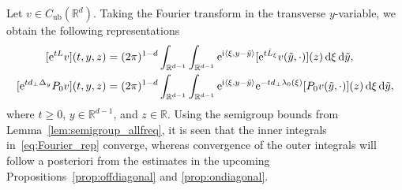 \documentclass[12pt,oneside,a4paper,reqno]{amsart}
\numberwithin{equation}{section}
\theoremstyle{definition}
\theoremstyle{remark}
\newcommand{\bbR}{{\mathbb R}}
\newcommand{\rd}{{\,\rm{d}}}
\newcommand{\Cub}{{C_{\mathrm{ub}}}}
\newcommand{\re}{{\rm e}}
\newcommand{\ri}{{\rm i}}
\begin{document}
Let $v \in \Cub(\bbR^{d})$. Taking the Fourier transform in the transverse $y$-variable, we obtain the following representations
\begin{align} \label{eq:Fourier_rep}
\begin{split}
    [\re^{tL}v](t,y,z) &= (2\pi)^{1-d}\int_{\bbR^{d-1}} \int_{\bbR^{d-1}} \re^{\ri \langle \xi, y - \tilde{y}\rangle} [\re^{t\hat{L}_{\xi}}v(\tilde{y},\cdot)](z) \rd \xi \rd \tilde{y}, \\
    [\re^{t d_{\bot}\Delta_y}P_0 v](t,y,z) &= (2\pi)^{1-d}\int_{\bbR^{d-1}} \int_{\bbR^{d-1}} \re^{\ri \langle \xi, y - \tilde{y}\rangle} \re^{-td_{\bot}\lambda_0(\xi)}[P_0 v(\tilde{y},\cdot)](z) \rd \xi \rd \tilde{y},
\end{split}
\end{align}
where $t \geq 0$, $y \in \bbR^{d-1}$, and $z \in \bbR$. Using the semigroup bounds from Lemma~\ref{lem:semigroup_allfreq}, it is seen that the inner integrals in~\eqref{eq:Fourier_rep} converge, whereas convergence of the outer integrals will follow a posteriori from the estimates in the upcoming Propositions~\ref{prop:offdiagonal} and \ref{prop:ondiagonal}.
\end{document}
